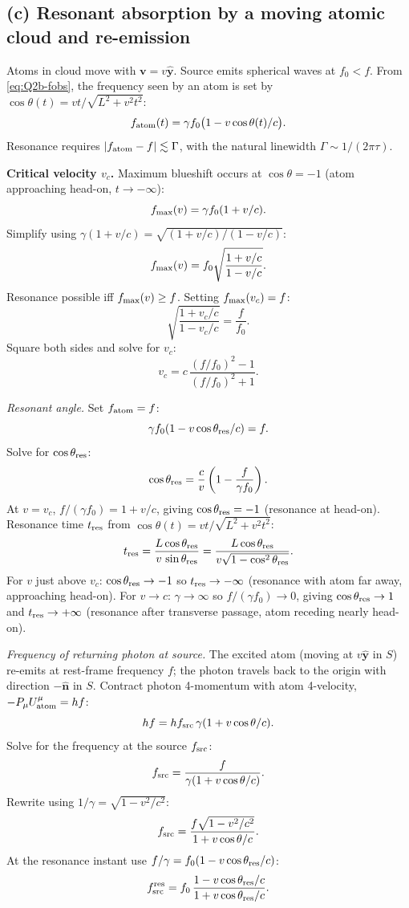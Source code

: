 \documentclass[11pt]{article}
\begin{document}
\subsection*{(c) Resonant absorption by a moving atomic cloud and re-emission}

Atoms in cloud move with $\bm v=v\hat{\bm y}$. Source emits spherical waves at $f_0<f$. From \eqref{eq:Q2b-fobs}, the frequency seen by an atom is set by $\cos\theta(t)=vt/\sqrt{L^2+v^2 t^2}$:
\[ f_{\rm atom}(t) = \gamma f_0\bigl(1 - v\cos\theta(t)/c\bigr). \]
Resonance requires $|f_{\rm atom}-f|\lesssim\Gamma$, with the natural linewidth $\Gamma\sim 1/(2\pi\tau)$.

\textbf{Critical velocity $v_c$.} Maximum blueshift occurs at $\cos\theta=-1$ (atom approaching head-on, $t\to-\infty$):
\[ f_{\rm max}(v) = \gamma f_0(1+v/c). \]
Simplify using $\gamma(1+v/c) = \sqrt{(1+v/c)/(1-v/c)}$:
\[ f_{\rm max}(v) = f_0\sqrt{\frac{1+v/c}{1-v/c}}. \]
Resonance possible iff $f_{\rm max}(v)\geq f$. Setting $f_{\rm max}(v_c) = f$:
\[ \sqrt{\frac{1+v_c/c}{1-v_c/c}} = \frac{f}{f_0}. \]
Square both sides and solve for $v_c$:
\[ v_c = c\,\frac{(f/f_0)^2-1}{(f/f_0)^2+1}. \]

\medskip
\noindent\emph{Resonant angle.} Set $f_{\rm atom} = f$:
\[ \gamma f_0(1 - v\cos\theta_{\rm res}/c) = f. \]
Solve for $\cos\theta_{\rm res}$:
\[ \cos\theta_{\rm res} = \frac{c}{v}\left(1 - \frac{f}{\gamma f_0}\right). \]
At $v = v_c$, $f/(\gamma f_0) = 1+v/c$, giving $\cos\theta_{\rm res}=-1$ (resonance at head-on).
Resonance time $t_{\rm res}$ from $\cos\theta(t) = vt/\sqrt{L^2+v^2 t^2}$:
\[ t_{\rm res} = \frac{L\cos\theta_{\rm res}}{v\,\sin\theta_{\rm res}} = \frac{L\cos\theta_{\rm res}}{v\sqrt{1-\cos^2\theta_{\rm res}}}. \]
For $v$ just above $v_c$: $\cos\theta_{\rm res}\to-1$ so $t_{\rm res}\to-\infty$ (resonance with atom far away, approaching head-on). For $v\to c$: $\gamma\to\infty$ so $f/(\gamma f_0)\to 0$, giving $\cos\theta_{\rm res}\to 1$ and $t_{\rm res}\to+\infty$ (resonance after transverse passage, atom receding nearly head-on).

\medskip
\noindent\emph{Frequency of returning photon at source.} The excited atom (moving at $v\hat{\bm y}$ in $S$) re-emits at rest-frame frequency $f$; the photon travels back to the origin with direction $-\hat{\bm n}$ in $S$. Contract photon 4-momentum with atom 4-velocity, $-P_\mu U^\mu_{\rm atom} = hf$:
\[ hf = h f_{\rm src}\,\gamma(1+v\cos\theta/c). \]
Solve for the frequency at the source $f_{\rm src}$:
\[ f_{\rm src} = \frac{f}{\gamma(1+v\cos\theta/c)}. \]
Rewrite using $1/\gamma = \sqrt{1-v^2/c^2}$:
\[ f_{\rm src} = \frac{f\sqrt{1-v^2/c^2}}{1+v\cos\theta/c}. \]
At the resonance instant use $f/\gamma = f_0(1-v\cos\theta_{\rm res}/c)$:
\[ f_{\rm src}^{\rm res} = f_0\,\frac{1-v\cos\theta_{\rm res}/c}{1+v\cos\theta_{\rm res}/c}. \]
\end{document}
